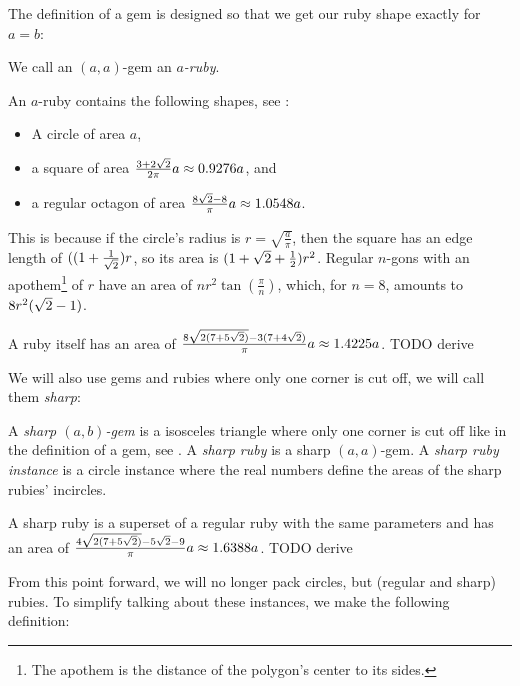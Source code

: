 \documentclass[a4paper,style=print,oneside,bibliography=totoc,nexus,lnum,extramargin]{tubsbook}
\begin{document}

The definition of a gem is designed so that we get our ruby shape exactly for $a = b$:

\begin{definition}
    We call an $(a,a)$-gem an \emph{$a$-ruby}.
\end{definition}

An $a$-ruby contains the following shapes, see :

\begin{itemize}
    \item A circle of area $a$,
    \item a square of area $\frac{3+2\sqrt{2}}{2\pi}a \approx 0.9276a$, and
    \item a regular octagon of area $\frac{8\sqrt{2}-8}{\pi}a \approx 1.0548a$.
\end{itemize}

This is because if the circle's radius is $r = \sqrt{\frac{a}{\pi}}$, then the square has an edge length of $((1+\frac{1}{\sqrt{2}})r$, so its area is $(1+\sqrt{2}+\frac{1}{2})r^2$. Regular $n$-gons with an apothem\footnote{The apothem is the distance of the polygon's center to its sides.} of $r$ have an area of $nr^2\tan(\frac{\pi}{n})$, which, for $n=8$, amounts to $8r^2(\sqrt{2}-1)$.


A ruby itself has an area of $\frac{8\sqrt{2(7+5\sqrt{2})}-3(7+4\sqrt{2})}{\pi}a \approx 1.4225a$. TODO derive

We will also use gems and rubies where only one corner is cut off, we will call them \emph{sharp}:

\begin{definition}
    A \emph{sharp $(a,b)$-gem} is a isosceles triangle where only one corner is cut off like in the definition of a gem, see . A \emph{sharp ruby} is a sharp $(a,a)$-gem. A \emph{sharp ruby instance} is a circle instance where the real numbers define the areas of the sharp rubies' incircles.
\end{definition}


A sharp ruby is a superset of a regular ruby with the same parameters and has an area of $\frac{4\sqrt{2(7+5\sqrt{2})}-5\sqrt{2}-9}{\pi}a \approx 1.6388a$. TODO derive

From this point forward, we will no longer pack circles, but (regular and sharp) rubies. To simplify talking about these instances, we make the following definition:
\end{document}
